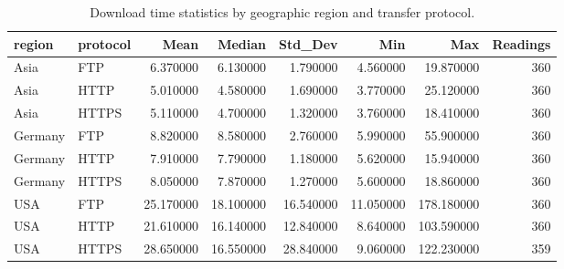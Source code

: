 \begin{table}
\caption{Download time statistics by geographic region and transfer protocol.}
\label{tab:download_stats}
\begin{tabular}{llrrrrrr}
\toprule
region & protocol & Mean & Median & Std_Dev & Min & Max & Readings \\
\midrule
Asia & FTP & 6.370000 & 6.130000 & 1.790000 & 4.560000 & 19.870000 & 360 \\
Asia & HTTP & 5.010000 & 4.580000 & 1.690000 & 3.770000 & 25.120000 & 360 \\
Asia & HTTPS & 5.110000 & 4.700000 & 1.320000 & 3.760000 & 18.410000 & 360 \\
Germany & FTP & 8.820000 & 8.580000 & 2.760000 & 5.990000 & 55.900000 & 360 \\
Germany & HTTP & 7.910000 & 7.790000 & 1.180000 & 5.620000 & 15.940000 & 360 \\
Germany & HTTPS & 8.050000 & 7.870000 & 1.270000 & 5.600000 & 18.860000 & 360 \\
USA & FTP & 25.170000 & 18.100000 & 16.540000 & 11.050000 & 178.180000 & 360 \\
USA & HTTP & 21.610000 & 16.140000 & 12.840000 & 8.640000 & 103.590000 & 360 \\
USA & HTTPS & 28.650000 & 16.550000 & 28.840000 & 9.060000 & 122.230000 & 359 \\
\bottomrule
\end{tabular}
\end{table}
